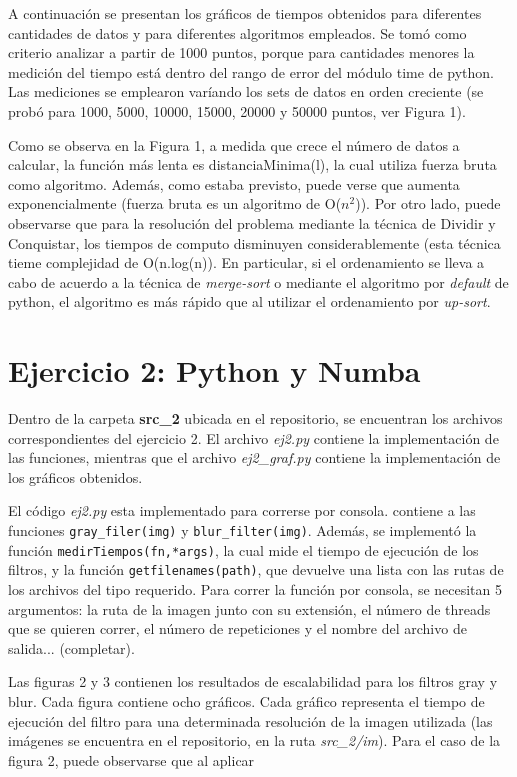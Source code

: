 \documentclass[12pt,a4paper]{article}
\begin{document}
A continuación se presentan los gráficos de tiempos obtenidos para diferentes cantidades de datos y para diferentes algoritmos empleados. Se tomó como criterio analizar a partir de 1000 puntos, porque para cantidades menores la medición del tiempo está dentro del rango de error del módulo time de python. Las mediciones se emplearon varíando los sets de datos en orden creciente (se probó para 1000, 5000, 10000, 15000, 20000 y 50000 puntos, ver Figura 1). \par 
Como se observa en la Figura 1, a medida que crece el número de datos a calcular, la función más lenta es distanciaMinima(l), la cual utiliza fuerza bruta como algoritmo. Además, como estaba previsto, puede verse que aumenta exponencialmente (fuerza bruta es un algoritmo de O($n^{2}$)). Por otro lado, puede observarse que para la resolución del problema mediante la técnica de Dividir y Conquistar, los tiempos de computo disminuyen considerablemente (esta técnica tieme complejidad de O(n.log(n)). En particular, si el ordenamiento se lleva a cabo de acuerdo a la técnica de \textit{merge-sort} o mediante el algoritmo por \textit{default} de python, el algoritmo es más rápido que al utilizar el ordenamiento por \textit{up-sort}.

\section{Ejercicio 2: Python y Numba}

Dentro de la carpeta \textbf{src\_2} ubicada en el repositorio, se encuentran los archivos correspondientes del ejercicio 2. El archivo \textit{ej2.py} contiene la implementación de las funciones, mientras que el archivo \textit{ej2\_graf.py} contiene la implementación de los gráficos obtenidos. \par 
El código \textit{ej2.py} esta implementado para correrse por consola.
contiene a las funciones \texttt{gray\_filer(img)} y \texttt{blur\_filter(img)}. Además, se implementó la función \texttt{medirTiempos(fn,*args)}, la cual mide el tiempo de ejecución de los filtros, y la función \texttt{getfilenames(path)}, que devuelve una lista con las rutas de los archivos del tipo requerido. Para correr la función por consola, se necesitan 5 argumentos: la ruta de la imagen junto con su extensión, el número de threads que se quieren correr, el número de repeticiones y el nombre del archivo de salida... (completar).

Las figuras 2 y 3 contienen los resultados de escalabilidad para los filtros gray y blur. Cada figura contiene ocho gráficos. Cada gráfico representa el tiempo de ejecución del filtro para una determinada resolución de la imagen utilizada (las imágenes se encuentra en el repositorio, en la ruta \textit{src\_2/im}). Para el caso de la figura 2, puede observarse que al aplicar  
\end{document}
